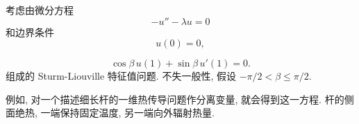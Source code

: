 \begin{Example}
\label{ex:sturm-liouville-robin-example}
考虑由微分方程
\begin{equation}\label{eq:sturm-liouville-robin-example-ode}
-u''-\lambda u=0
\end{equation}
和边界条件
\begin{equation}\label{eq:sturm-liouville-robin-example-left-condition}
u(0)=0,
\end{equation}

\begin{equation}\label{eq:sturm-liouville-robin-example-right-condition}
\cos\beta\,u(1)+\sin\beta\,u'(1)=0.
\end{equation}
组成的 Sturm-Liouville 特征值问题. 不失一般性, 假设 $-\pi/2<\beta\leq\pi/2$.

例如, 对一个描述细长杆的一维热传导问题作分离变量, 就会得到这一方程. 杆的侧面绝热, 一端保持固定温度, 另一端向外辐射热量.


\end{Example}
